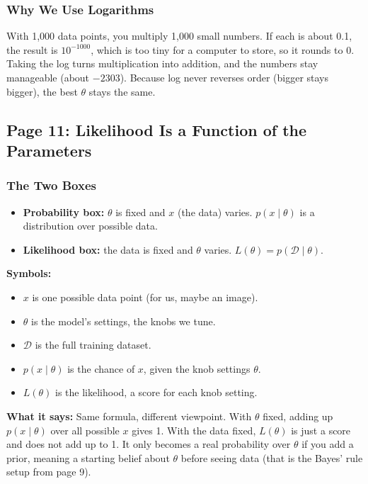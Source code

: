 \subsubsection*{Why We Use Logarithms}

With 1,000 data points, you multiply 1,000 small numbers. If each is about 0.1, the result is $10^{-1000}$, which is too tiny for a computer to store, so it rounds to 0. Taking the log turns multiplication into addition, and the numbers stay manageable (about $-2303$). Because log never reverses order (bigger stays bigger), the best $\theta$ stays the same.

\subsection*{Page 11: Likelihood Is a Function of the Parameters}

\subsubsection*{The Two Boxes}

\begin{itemize}
  \item \textbf{Probability box:} $\theta$ is fixed and $x$ (the data) varies. $p(x \mid \theta)$ is a distribution over possible data.
  \item \textbf{Likelihood box:} the data is fixed and $\theta$ varies. $L(\theta) = p(\mathcal{D} \mid \theta)$.
\end{itemize}

\textbf{Symbols:}
\begin{itemize}
  \item $x$ is one possible data point (for us, maybe an image).
  \item $\theta$ is the model's settings, the knobs we tune.
  \item $\mathcal{D}$ is the full training dataset.
  \item $p(x \mid \theta)$ is the chance of $x$, given the knob settings $\theta$.
  \item $L(\theta)$ is the likelihood, a score for each knob setting.
\end{itemize}

\textbf{What it says:} Same formula, different viewpoint. With $\theta$ fixed, adding up $p(x \mid \theta)$ over all possible $x$ gives 1. With the data fixed, $L(\theta)$ is just a score and does not add up to 1. It only becomes a real probability over $\theta$ if you add a prior, meaning a starting belief about $\theta$ before seeing data (that is the Bayes' rule setup from page 9).

